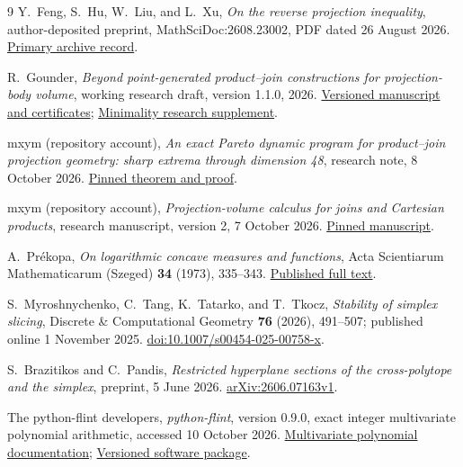 \documentclass[11pt,a4paper]{article}
\begin{document}
\begin{thebibliography}{9}
Y.~Feng, S.~Hu, W.~Liu, and L.~Xu,
\emph{On the reverse projection inequality}, author-deposited preprint,
MathSciDoc:2608.23002, PDF dated 26 August 2026.
\href{https://archive.ymsc.tsinghua.edu.cn/pacm_paperurl/20260821091122099811781}{Primary archive record}.

R.~Gounder, \emph{Beyond point-generated product--join constructions
for projection-body volume}, working research draft, version 1.1.0, 2026.
\href{https://github.com/Kohze/projection-body-separation/releases/tag/v1.1.0}{Versioned manuscript and certificates};
\href{https://github.com/Kohze/projection-body-separation/tree/main/research/minimality}{Minimality research supplement}.

mxym (repository account), \emph{An exact Pareto dynamic program for
product--join projection geometry: sharp extrema through dimension 48},
research note, 8 October 2026.
\href{https://github.com/mxym/math/blob/55ba5a7be927e3e7d2dbfd8d054db91b63d8d755/notes/exact-product-join-finite-optima/paper.md}{Pinned theorem and proof}.

mxym (repository account), \emph{Projection-volume calculus for joins
and Cartesian products}, research manuscript, version 2, 7 October 2026.
\href{https://github.com/mxym/math/blob/2fc3f25179cf1128c4bccbde65fd3a07c093ad6d/preprints/005-simplex-product-optimum/v2/paper.md}{Pinned manuscript}.

A.~Pr\'ekopa, \emph{On logarithmic concave measures and functions},
Acta Scientiarum Mathematicarum (Szeged) \textbf{34} (1973), 335--343.
\href{https://acta.bibl.u-szeged.hu/14411/1/math_034_335-343.pdf}{Published full text}.

S.~Myroshnychenko, C.~Tang, K.~Tatarko, and T.~Tkocz,
\emph{Stability of simplex slicing}, Discrete \& Computational Geometry
\textbf{76} (2026), 491--507; published online 1 November 2025.
\href{https://doi.org/10.1007/s00454-025-00758-x}{doi:10.1007/s00454-025-00758-x}.

S.~Brazitikos and C.~Pandis, \emph{Restricted hyperplane sections of
the cross-polytope and the simplex}, preprint, 5 June 2026.
\href{https://arxiv.org/abs/2606.07163}{arXiv:2606.07163v1}.

The python-flint developers, \emph{python-flint}, version 0.9.0,
exact integer multivariate polynomial arithmetic, accessed 10 October 2026.
\href{https://python-flint.readthedocs.io/en/latest/fmpz_mpoly.html}{Multivariate polynomial documentation};
\href{https://pypi.org/project/python-flint/0.9.0/}{Versioned software package}.
\end{thebibliography}
\end{document}
